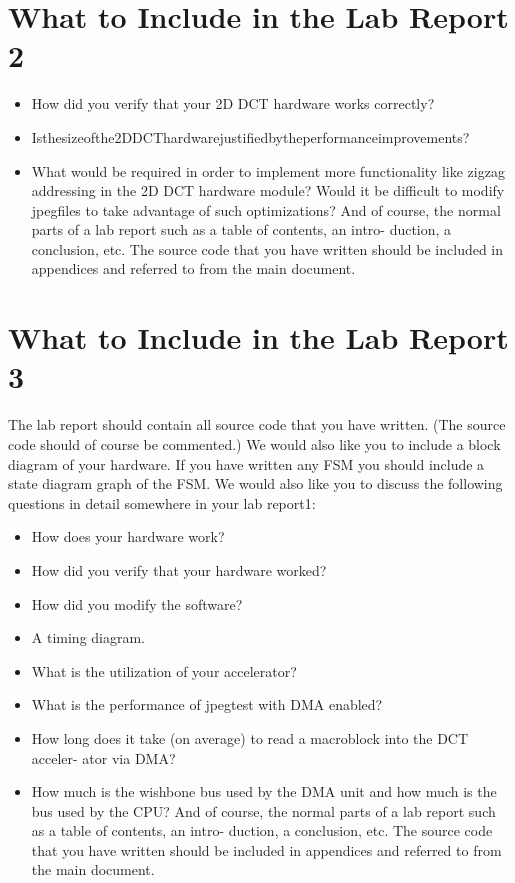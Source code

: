 \documentclass[a4paper]{article}
\begin{document}
\section{What to Include in the Lab Report 2}
\begin{itemize}
\item How did you verify that your 2D DCT hardware works correctly?
\item Isthesizeofthe2DDCThardwarejustifiedbytheperformanceimprovements?
\item What would be required in order to implement more functionality like zigzag addressing in the 2D DCT hardware module? Would it be difficult to modify jpegfiles to take advantage of such optimizations?
And of course, the normal parts of a lab report such as a table of contents, an intro- duction, a conclusion, etc. The source code that you have written should be included in appendices and referred to from the main document.
\end{itemize}


\section{What to Include in the Lab Report 3}
The lab report should contain all source code that you have written. (The source code should of course be commented.) We would also like you to include a block diagram of your hardware. If you have written any FSM you should include a state diagram graph of the FSM.
We would also like you to discuss the following questions in detail somewhere in your lab report1:
\begin{itemize}
\item How does your hardware work?
\item How did you verify that your hardware worked?
\item How did you modify the software?
\item A timing diagram.
\item What is the utilization of your accelerator?
\item What is the performance of jpegtest with DMA enabled?
\item How long does it take (on average) to read a macroblock into the DCT acceler- ator via DMA?
\item How much is the wishbone bus used by the DMA unit and how much is the bus used by the CPU?
And of course, the normal parts of a lab report such as a table of contents, an intro- duction, a conclusion, etc. The source code that you have written should be included in appendices and referred to from the main document.
\end{itemize}
\end{document}
